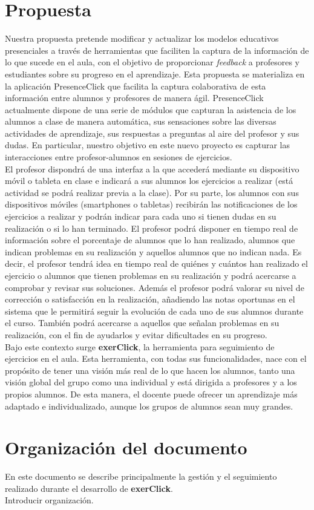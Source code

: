 \section{Propuesta}

Nuestra propuesta pretende modificar y actualizar los modelos educativos presenciales a través de herramientas que faciliten la captura de la información de lo que sucede en el aula, con el objetivo de proporcionar \textit{feedback} a profesores y estudiantes sobre su progreso en el aprendizaje. Esta propuesta se materializa en la aplicación PresenceClick que facilita la captura colaborativa de esta información entre alumnos y profesores de manera ágil. PresenceClick actualmente dispone de una serie de módulos que capturan la asistencia de los alumnos a clase de manera automática, sus sensaciones sobre las diversas actividades de aprendizaje, sus respuestas a preguntas al aire del profesor y sus dudas. En particular, nuestro objetivo en este nuevo proyecto es capturar las interacciones entre profesor-alumnos en sesiones de ejercicios.\\

El profesor dispondrá de una interfaz a la que accederá mediante su dispositivo móvil o tableta en clase e indicará a sus alumnos los ejercicios a realizar (está actividad se podrá realizar previa a la clase). Por su parte, los alumnos con sus dispositivos móviles (smartphones o tabletas) recibirán las notificaciones de los ejercicios a realizar y podrán indicar para cada uno si tienen dudas en su realización o si lo han terminado. El profesor podrá disponer en tiempo real de información sobre el porcentaje de alumnos que lo han realizado, alumnos que indican problemas en su realización y aquellos alumnos que no indican nada. Es decir, el profesor tendrá idea en tiempo real de quiénes y cuántos han realizado el ejercicio o alumnos que tienen problemas en su realización y podrá acercarse a comprobar y revisar sus soluciones. Además el profesor podrá valorar su nivel de corrección o satisfacción en la realización, añadiendo las notas oportunas en el sistema que le permitirá seguir la evolución de cada uno de sus alumnos durante el curso. También podrá acercarse a aquellos que señalan problemas en su realización, con el fin de ayudarlos y evitar dificultades en su progreso.\\

Bajo este contexto surge \textbf{exerClick}, la herramienta para seguimiento de ejercicios en el aula. Esta herramienta, con todas sus funcionalidades, nace con el propósito de tener una visión más real de lo que hacen los alumnos, tanto una visión global del grupo como una individual y está dirigida a profesores y a los propios alumnos. De esta manera, el docente puede ofrecer un aprendizaje más adaptado e individualizado, aunque los grupos de alumnos sean muy grandes.\\

\section{Organización del documento}

En este documento se describe principalmente la gestión y el seguimiento realizado durante el desarrollo de \textbf{exerClick}.\\

Introducir organización.\\